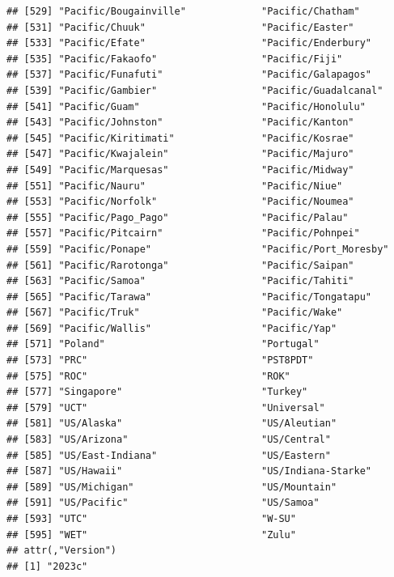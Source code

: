 \documentclass[
]{book}
\begin{document}
\begin{verbatim}
## [529] "Pacific/Bougainville"             "Pacific/Chatham"                 
## [531] "Pacific/Chuuk"                    "Pacific/Easter"                  
## [533] "Pacific/Efate"                    "Pacific/Enderbury"               
## [535] "Pacific/Fakaofo"                  "Pacific/Fiji"                    
## [537] "Pacific/Funafuti"                 "Pacific/Galapagos"               
## [539] "Pacific/Gambier"                  "Pacific/Guadalcanal"             
## [541] "Pacific/Guam"                     "Pacific/Honolulu"                
## [543] "Pacific/Johnston"                 "Pacific/Kanton"                  
## [545] "Pacific/Kiritimati"               "Pacific/Kosrae"                  
## [547] "Pacific/Kwajalein"                "Pacific/Majuro"                  
## [549] "Pacific/Marquesas"                "Pacific/Midway"                  
## [551] "Pacific/Nauru"                    "Pacific/Niue"                    
## [553] "Pacific/Norfolk"                  "Pacific/Noumea"                  
## [555] "Pacific/Pago_Pago"                "Pacific/Palau"                   
## [557] "Pacific/Pitcairn"                 "Pacific/Pohnpei"                 
## [559] "Pacific/Ponape"                   "Pacific/Port_Moresby"            
## [561] "Pacific/Rarotonga"                "Pacific/Saipan"                  
## [563] "Pacific/Samoa"                    "Pacific/Tahiti"                  
## [565] "Pacific/Tarawa"                   "Pacific/Tongatapu"               
## [567] "Pacific/Truk"                     "Pacific/Wake"                    
## [569] "Pacific/Wallis"                   "Pacific/Yap"                     
## [571] "Poland"                           "Portugal"                        
## [573] "PRC"                              "PST8PDT"                         
## [575] "ROC"                              "ROK"                             
## [577] "Singapore"                        "Turkey"                          
## [579] "UCT"                              "Universal"                       
## [581] "US/Alaska"                        "US/Aleutian"                     
## [583] "US/Arizona"                       "US/Central"                      
## [585] "US/East-Indiana"                  "US/Eastern"                      
## [587] "US/Hawaii"                        "US/Indiana-Starke"               
## [589] "US/Michigan"                      "US/Mountain"                     
## [591] "US/Pacific"                       "US/Samoa"                        
## [593] "UTC"                              "W-SU"                            
## [595] "WET"                              "Zulu"                            
## attr(,"Version")
## [1] "2023c"
\end{verbatim}
\end{document}
